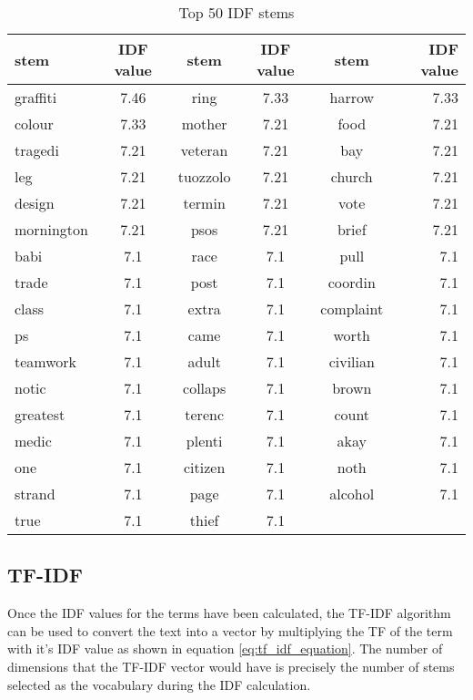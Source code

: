 \begin{table}
\begin{center}
\caption{Top 50 IDF stems}
\label{tbl:idf_stems}
\begin{tabular}{lc|cc|cr|}
\toprule
stem&IDF value&stem&IDF value&stem&IDF value\\
\midrule
graffiti&7.46&ring&7.33&harrow&7.33\\ \hline 
colour&7.33&mother&7.21&food&7.21\\ \hline 
tragedi&7.21&veteran&7.21&bay&7.21\\ \hline 
leg&7.21&tuozzolo&7.21&church&7.21\\ \hline 
design&7.21&termin&7.21&vote&7.21\\ \hline 
mornington&7.21&psos&7.21&brief&7.21\\ \hline 
babi&7.1&race&7.1&pull&7.1\\ \hline 
trade&7.1&post&7.1&coordin&7.1\\ \hline 
class&7.1&extra&7.1&complaint&7.1\\ \hline 
ps&7.1&came&7.1&worth&7.1\\ \hline 
teamwork&7.1&adult&7.1&civilian&7.1\\ \hline 
notic&7.1&collaps&7.1&brown&7.1\\ \hline 
greatest&7.1&terenc&7.1&count&7.1\\ \hline 
medic&7.1&plenti&7.1&akay&7.1\\ \hline 
one&7.1&citizen&7.1&noth&7.1\\ \hline 
strand&7.1&page&7.1&alcohol&7.1\\ \hline 
true&7.1&thief&7.1&&\\
\bottomrule
\end{tabular}
\end{center}
\end{table}


\subsection{TF-IDF}
Once the IDF values for the terms have been calculated, the TF-IDF algorithm can be used to convert the text into a vector by multiplying the TF of the term with it's IDF value as shown in equation \eqref{eq:tf_idf_equation}. The number of dimensions that the TF-IDF vector would have is precisely the number of stems selected as the vocabulary during the IDF calculation.

